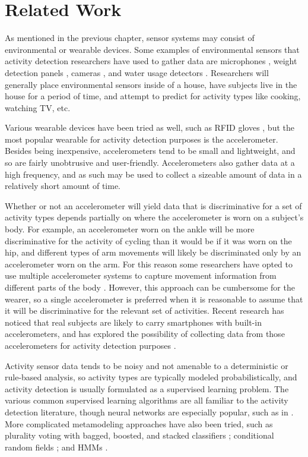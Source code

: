 \chapter{Related Work}
As mentioned in the previous chapter, sensor systems may consist
of environmental or wearable devices. Some examples of environmental
sensors that activity detection researchers have used to
gather data are microphones \cite{fogarty06}, weight detection
panels \cite{rowan05}, cameras \cite{duong05}, and water usage detectors
\cite{fogarty06}. Researchers will generally place environmental sensors
inside of a house, have subjects live in the house for a period of time, and
attempt to predict for activity types like cooking, watching TV, etc.

Various wearable devices have been tried as well, such as RFID gloves
\cite{gu09} \cite{rowan05}, but the most popular wearable for activity detection
purposes is the accelerometer. Besides being inexpensive, accelerometers
tend to be small and lightweight, and so are fairly unobtrusive and
user-friendly. Accelerometers also gather data at a high frequency, and as such
may be used to collect a sizeable amount of data in a relatively short amount
of time.

Whether or not an accelerometer will yield data that is discriminative for a
set of activity types depends partially on where the accelerometer is worn on
a subject's body. For example, an accelerometer worn on the ankle will be
more discriminative for the activity of cycling than it would be if it was worn
on the hip, and different types of arm movements will likely be
discriminated only by an accelerometer worn on the arm. For this reason some
researchers have opted to use multiple accelerometer systems to capture
movement information from different parts of the body \cite{bao04}
\cite{devries11}. However, this approach can be cumbersome for the wearer, so a
single accelerometer is preferred when it is reasonable to assume that it will
be discriminative for the relevant set of activities. Recent research has
noticed that real subjects are likely to carry smartphones with built-in
accelerometers, and has explored the possibility of collecting data from those
accelerometers for activity detection purposes \cite{bao04} \cite{choudhury08}
\cite{kwapitz10} \cite{rai12}.

Activity sensor data tends to be noisy and not amenable to a
deterministic or rule-based analysis, so activity types are typically modeled
probabilistically, and activity detection is usually formulated as a supervised
learning problem. The various common supervised learning algorithms are all
familiar to the activity detection literature, though neural networks are
especially popular, such as in \cite{aminian95} \cite{song07} \cite{staudenmeyer09}.
More complicated metamodeling approaches have also been tried, such as
plurality voting with bagged, boosted, and stacked classifiers \cite{ravi05};
conditional random fields \cite{blanke10} \cite{gu09} \cite{vankasteren08}
\cite{wu09}; and HMMs \cite{gu09} \cite{lester05} \cite{pober06} \cite{wu09}.

